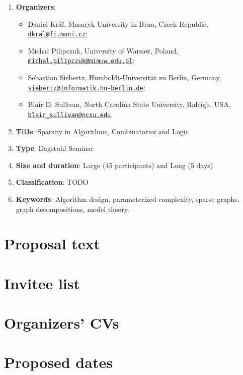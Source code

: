 \documentclass[10pt]{article}
\newcommand{\ourtitle}{Sparsity in Algorithms, Combinatorics and Logic}
\newcommand{\email}[1]{\href{mailto:#1}{\nolinkurl{#1}}}
\begin{document}
\begin{enumerate}
\item {\bf{Organizers}}:
\begin{itemize}
\item Daniel Kr\'a\v{l}, Masaryk University in Brno, Czech Republic, \email{dkral@fi.muni.cz};
\item Micha\l{} Pilipczuk, University of Warsaw, Poland, \email{michal.pilipczuk@mimuw.edu.pl};
\item Sebastian Siebertz, Humboldt-Universit\"at zu Berlin, Germany, \mbox{\email{siebertz@informatik.hu-berlin.de};}
\item Blair D. Sullivan, North Carolina State University, Raleigh, USA, \email{blair_sullivan@ncsu.edu}.
\end{itemize}
\item {\bf{Title}}: \ourtitle
\item {\bf{Type}}: Dagstuhl Seminar
\item {\bf{Size and duration}}: Large (45 participants) and Long (5 days)
\item {\bf{Classification}}: TODO
\item {\bf{Keywords}}: Algorithm design, parameterized complexity, sparse graphs, graph decompositions, model theory.
\end{enumerate}

\pagebreak
\section{Proposal text}











\begin{footnotesize}


\end{footnotesize}

\pagebreak

\section{Invitee list}



\section{Organizers' CVs}

\section{Proposed dates}


\end{document}
